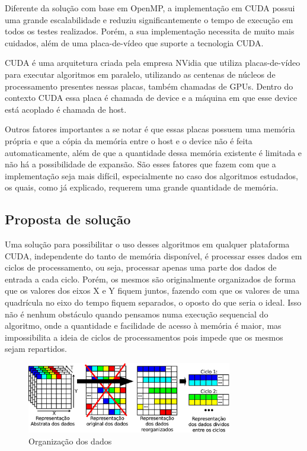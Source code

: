 Diferente da solução com base em OpenMP, a implementação em CUDA \cite{cuda_guide} possui uma grande escalabilidade e reduziu significantemente o tempo de execução em todos os testes realizados. Porém, a sua implementação necessita de muito mais cuidados, além de uma placa-de-vídeo que suporte a tecnologia CUDA.

CUDA é uma arquitetura criada pela empresa NVidia que utiliza placas-de-vídeo para executar algoritmos em paralelo, utilizando as centenas de núcleos de processamento presentes nessas placas, também chamadas de GPUs. Dentro do contexto CUDA essa placa é chamada de device e a máquina em que esse device está acoplado é chamada de host.

Outros fatores importantes a se notar é que essas placas possuem uma memória própria e que a cópia da memória entre o host e o device não é feita automaticamente, além de que a quantidade dessa memória existente é limitada e não há a possibilidade de expansão. São esses fatores que fazem com que a implementação seja mais difícil, especialmente no caso dos algoritmos estudados, os quais, como já explicado, requerem uma grande quantidade de memória.

\subsection{Proposta de solução}\label{cap:proposta_solucao}

Uma solução para possibilitar o uso desses algoritmos em qualquer plataforma CUDA, independente do tanto de memória disponível, é processar esses dados em ciclos de processamento, ou seja, processar apenas uma parte dos dados de entrada a cada ciclo. Porém, os mesmos são originalmente organizados de forma que os valores dos eixos X e Y fiquem juntos, fazendo com que os valores de uma quadrícula no eixo do tempo fiquem separados, o oposto do que seria o ideal. Isso não é nenhum obstáculo quando pensamos numa execução sequencial do algoritmo, onde a quantidade e facilidade de acesso à memória é maior, mas impossibilita a ideia de ciclos de processamentos pois impede que os mesmos sejam repartidos.

\begin{figure}[H]
\centering
\includegraphics[width=0.8\textwidth]{Imagens/organizacao_dados/organizacao_dados.png}
\caption{Organização dos dados}
\label{fig:organizacao_dados_2}
\end{figure}

